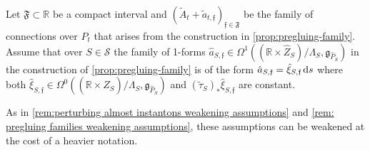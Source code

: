 \documentclass[11pt,a4paper]{scrartcl}
\newcommand*\diff{\mathop{}\!\textup{d}}
\numberwithin{equation}{section}
\theoremstyle{plain}
\theoremstyle{definition}
\theoremstyle{remark}
\begin{document}
\begin{assumption}\label{ass: very simple family of gluing data}
Let $\mathfrak{F} \subset \mathbb{R}$ be a compact interval and $(\tilde{A}_t+\tilde{a}_{t,\mathfrak{f}})_{\mathfrak{f} \in \mathfrak{F}}$ be the family of connections over $\hat{P}_t$ that arises from the construction in \autoref{prop:pregluing-family}. Assume that over $S\in \mathcal{S}$ the family of 1-forms $\hat{a}_{S,\mathfrak{f}} \in \Omega^1((\mathbb{R}\times \hat{Z}_S)/\Lambda_S,\mathfrak{g}_{\hat{P}_S})$ in the construction of \autoref{prop:pregluing-family} is of the form $\hat{a}_{S,\mathfrak{f}} = \hat{\xi}_{S,\mathfrak{f}} \diff s$ where both $\hat{\xi}_{S,\mathfrak{f}} \in \Omega^0((\mathbb{R}\times\hat{Z}_S)/\Lambda_S,\mathfrak{g}_{\hat{P}_S})$ and $(\tilde{\tau}_S)_*\hat{\xi}_{S,\mathfrak{f}}$ are constant.
\end{assumption}
\begin{remark}
As in \autoref{rem:perturbing almost instantons weakening assumptions} and \autoref{rem: pregluing families weakening assumptions}, these assumptions can be weakened at the cost of a heavier notation.
\end{remark}
\end{document}
